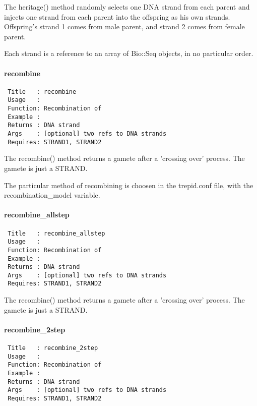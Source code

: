 The heritage() method randomly selects one DNA strand from each parent
and injects one strand from each parent into the offspring as his own
strands. Offspring's strand 1 comes from male parent, and strand 2
comes from female parent.



Each strand is a reference to an array of Bio::Seq objects, in no
particular order.

\paragraph*{recombine\label{recombine}}
\begin{verbatim}
 Title   : recombine
 Usage   : 
 Function: Recombination of 
 Example : 
 Returns : DNA strand
 Args    : [optional] two refs to DNA strands
 Requires: STRAND1, STRAND2
\end{verbatim}


The recombine() method returns a gamete after a 'crossing over'
process. The gamete is just a STRAND.



The particular method of recombining is choosen in the trepid.conf
file, with the recombination\_model variable.

\paragraph*{recombine\_allstep\label{recombine_allstep}}
\begin{verbatim}
 Title   : recombine_allstep
 Usage   : 
 Function: Recombination of 
 Example : 
 Returns : DNA strand
 Args    : [optional] two refs to DNA strands
 Requires: STRAND1, STRAND2
\end{verbatim}


The recombine() method returns a gamete after a 'crossing over'
process. The gamete is just a STRAND.

\paragraph*{recombine\_2step\label{recombine_2step}}
\begin{verbatim}
 Title   : recombine_2step
 Usage   : 
 Function: Recombination of 
 Example : 
 Returns : DNA strand
 Args    : [optional] two refs to DNA strands
 Requires: STRAND1, STRAND2
\end{verbatim}


